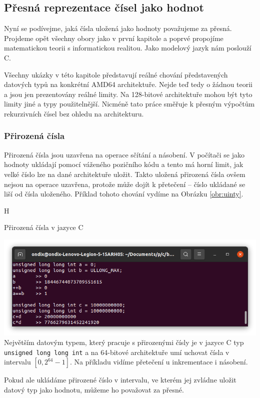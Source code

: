 \subsection{Přesná reprezentace čísel jako hodnot}
Nyní se podívejme, jaká čísla uložená jako hodnoty považujeme za přesná. Projdeme opět všechny obory jako v první kapitole a poprvé propojíme matematickou teorii s informatickou realitou. Jako modelový jazyk nám poslouží C.

Všechny ukázky v této kapitole představují reálné chování představených datových typů na konkrétní AMD64 architektuře. Nejde teď tedy o žádnou teorii a jsou jen prezentovány reálné limity. Na 128-bitové architektuře mohou být tyto limity jiné a typy použitelnější. Nicméně tato práce směřuje k přesným výpočtům rekurzivních čísel bez ohledu na architekturu.

\subsubsection{Přirozená čísla}
Přirozená čísla jsou uzavřena na operace sčítání a násobení. V počítači se jako hodnoty ukládají pomocí váženého pozičního kódu a tento má horní limit, jak velké číslo lze na dané architektuře uložit. Takto uložená přirozená čísla ovšem nejsou na operace uzavřena, protože může dojít k přetečení -- číslo ukládané se liší od čísla uloženého. Příklad tohoto chování vydíme na Obrázku \ref{obr:uinty}.
\begin{myfigure}{H}
\caption{Přirozená čísla v jazyce C}
\includegraphics[width=\linewidth]{./graphics/uinty.png}\label{obr:uinty}
Největším datovým typem, který pracuje s přirozenými čísly je v jazyce C typ \texttt{unsigned long long int} a na 64-bitové architektuře umí uchovat čísla v intervalu $[0, 2^{64}-1]$. Na příkladu vidíme přetečení u inkrementace i násobení.
\end{myfigure}
Pokud ale ukládáme přirozené číslo v intervalu, ve kterém jej zvládne uložit datový typ jako hodnotu, můžeme ho považovat za přesné.

